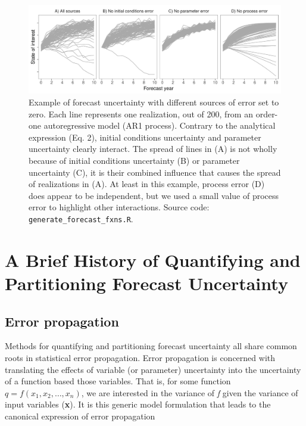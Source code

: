 \documentclass[12pt,]{article}
\begin{document}
\begin{figure}
\centering
\includegraphics{../figures/forecast_uncertainty_example.pdf}
\caption{Example of forecast uncertainty with different sources of error
set to zero. Each line represents one realization, out of 200, from an
order-one autoregressive model (AR1 process). Contrary to the analytical
expression (Eq. 2), initial conditions uncertainty and parameter
uncertainty clearly interact. The spread of lines in (A) is not wholly
because of initial conditions uncertainty (B) or parameter uncertainty
(C), it is their combined influence that causes the spread of
realizations in (A). At least in this example, process error (D) does
appear to be independent, but we used a small value of process error to
highlight other interactions. Source code:
\texttt{generate\_forecast\_fxns.R}.}
\end{figure}

\hypertarget{a-brief-history-of-quantifying-and-partitioning-forecast-uncertainty}{%
\section{A Brief History of Quantifying and Partitioning Forecast
Uncertainty}\label{a-brief-history-of-quantifying-and-partitioning-forecast-uncertainty}}

\hypertarget{error-propagation}{%
\subsection{Error propagation}\label{error-propagation}}

Methods for quantifying and partitioning forecast uncertainty all share
common roots in statistical error propagation. Error propagation is
concerned with translating the effects of variable (or parameter)
uncertainty into the uncertainty of a function based those variables.
That is, for some function \(q = f(x_1,x_2,\dots,x_n)\), we are
interested in the variance of \emph{f} given the variance of input
variables (\textbf{x}). It is this generic model formulation that leads
to the canonical expression of error propagation
\end{document}
